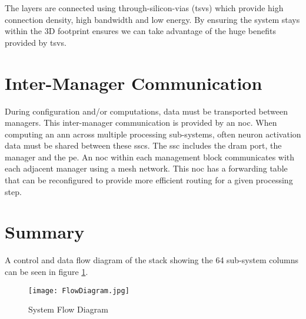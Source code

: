 The layers are connected using through-silicon-vias (\ac{tsv}s) which provide high connection density, high bandwidth and low energy.
By ensuring the system stays within the 3D footprint ensures we can take advantage of the huge benefits provided by \ac{tsv}s.

\section{Inter-Manager Communication}
\label{sec:Inter-Manager Communication}

During configuration and/or computations, data must be transported between managers. This inter-manager communication is provided by an \ac{noc}.
When computing an \ac{ann} across multiple processing sub-systems, often neuron activation data must be shared between these \ac{ssc}s. The \ac{ssc} includes the \ac{dram} port, the manager and the \ac{pe}. An \ac{noc} within each management block communicates with each adjacent manager using a mesh network. This \ac{noc} has a forwarding table that can be reconfigured to provide more efficient routing for a given processing step.

\section{Summary}
\label{sec:Overview Summary}

A control and data flow diagram of the stack showing the 64 sub-system columns can be seen in figure \ref{fig:FlowDiagram}.
\begin{figure}[!t]
\centering
\captionsetup{justification=centering}
\centerline{
\mbox{\texttt{[image: FlowDiagram.jpg]}}
}
\caption{System Flow Diagram}
\label{fig:FlowDiagram}
\end{figure}

